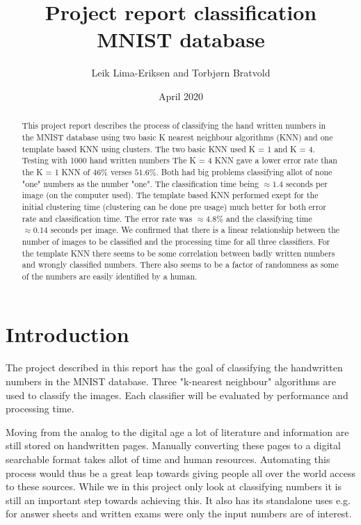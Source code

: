 \documentclass{article}
\title{Project report classification MNIST database}
\author{Leik Lima-Eriksen and Torbjørn Bratvold}
\date{April 2020}
\begin{document}
\maketitle
\begin{abstract}

This project report describes the process of classifying the hand written numbers in the MNIST database\cite{MNIST} using two basic K nearest neighbour algorithms (KNN) and one template based KNN using clusters.  The two basic KNN used K = 1 and K = 4. Testing with 1000 hand written numbers The K = 4 KNN gave a lower error rate than the K = 1 KNN of $46\%$ verses $51.6\%$. Both had big problems classifying allot of none "one" numbers as the number "one". The classification time being $\approx1.4$ seconds per image (on the computer used). The template based KNN performed exept for the initial clustering  time (clustering can be done pre usage) much better for both error rate and classification time. The error rate was $\approx 4.8\%$ and the classifying time $\approx 0.14$ seconds per image. We confirmed that there is a linear relationship between the number of images to be classified and the processing time for all three classifiers. For the template KNN there seems to be some correlation between badly written numbers and wrongly classified numbers. There also seems to be a factor of randomness as some of the numbers are easily identified by a human.

\end{abstract}

\newpage
\tableofcontents
\newpage
\section{Introduction}
The project described in this report has the goal of classifying the handwritten numbers in the MNIST database\cite{MNIST}.
Three "k-nearest neighbour" algorithms are used to classify the images. Each classifier will be evaluated by performance and processing time.

Moving from the analog to the digital age a lot of literature and information are still stored on handwritten pages. Manually converting these pages to a digital searchable format takes allot of time and human resources. Automating this process would thus be a great leap towards giving people all over the world access to these sources. While we in this project only look at classifying numbers it is still an important step towards achieving this. It also has its standalone uses e.g. for answer sheets and written exams were only the input numbers are of interest.
\end{document}
